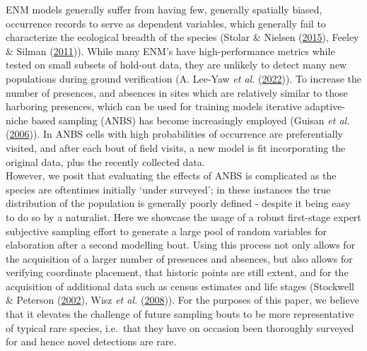\documentclass[
]{article}
\begin{document}
ENM models generally suffer from having few, generally spatially biased,
occurrence records to serve as dependent variables, which generally fail
to characterize the ecological breadth of the species (Stolar \& Nielsen
(\protect\hyperlink{ref-stolar2015accounting}{2015}), Feeley \& Silman
(\protect\hyperlink{ref-feeley2011keep}{2011})). While many ENM's have
high-performance metrics while tested on small subsets of hold-out data,
they are unlikely to detect many new populations during ground
verification (A. Lee-Yaw \emph{et al.}
(\protect\hyperlink{ref-a2022species}{2022})). To increase the number of
presences, and absences in sites which are relatively similar to those
harboring presences, which can be used for training models iterative
adaptive-niche based sampling (ANBS) has become increasingly employed
(Guisan \emph{et al.} (\protect\hyperlink{ref-guisan2006using}{2006})).
In ANBS cells with high probabilities of occurrence are preferentially
visited, and after each bout of field visits, a new model is fit
incorporating the original data, plus the recently collected data.\\
However, we posit that evaluating the effects of ANBS is complicated as
the species are oftentimes initially `under surveyed'; in these
instances the true distribution of the population is generally poorly
defined - despite it being easy to do so by a naturalist. Here we
showcase the usage of a robust first-stage expert subjective sampling
effort to generate a large pool of random variables for elaboration
after a second modelling bout. Using this process not only allows for
the acquisition of a larger number of presences and absences, but also
allows for verifying coordinate placement, that historic points are
still extent, and for the acquisition of additional data such as census
estimates and life stages (Stockwell \& Peterson
(\protect\hyperlink{ref-stockwell2002effects}{2002}), Wisz \emph{et al.}
(\protect\hyperlink{ref-wisz2008effects}{2008})). For the purposes of
this paper, we believe that it elevates the challenge of future sampling
bouts to be more representative of typical rare species, i.e.~that they
have on occasion been thoroughly surveyed for and hence novel detections
are rare.
\end{document}
